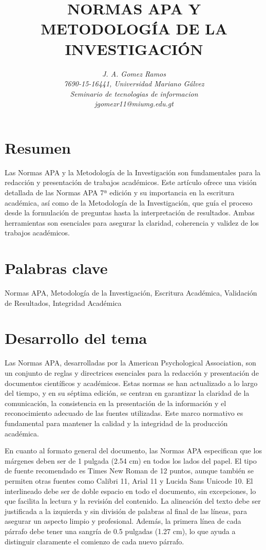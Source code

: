 \documentclass[12pt]{article}
\begin{document}
\title{\textbf{NORMAS APA Y METODOLOGÍA DE LA INVESTIGACIÓN}}
\author{\textit{J. A. Gomez Ramos}\\
\textit{7690-15-16441, Universidad Mariano Gálvez}\\
\textit{Seminario de tecnologias de informacion}\\
\textit{jgomezr11@miumg.edu.gt}}
\date{}
\maketitle

\section*{Resumen}
Las Normas APA y la Metodología de la Investigación son fundamentales para la redacción y presentación de trabajos académicos. Este artículo ofrece una visión detallada de las Normas APA 7ª edición y su importancia en la escritura académica, así como de la Metodología de la Investigación, que guía el proceso desde la formulación de preguntas hasta la interpretación de resultados. Ambas herramientas son esenciales para asegurar la claridad, coherencia y validez de los trabajos académicos.

\section*{Palabras clave}
Normas APA, Metodología de la Investigación, Escritura Académica, Validación de Resultados, Integridad Académica

\section*{Desarrollo del tema}

Las Normas APA, desarrolladas por la American Psychological Association, son un conjunto de reglas y directrices esenciales para la redacción y presentación de documentos científicos y académicos. Estas normas se han actualizado a lo largo del tiempo, y en su séptima edición, se centran en garantizar la claridad de la comunicación, la consistencia en la presentación de la información y el reconocimiento adecuado de las fuentes utilizadas. Este marco normativo es fundamental para mantener la calidad y la integridad de la producción académica.

En cuanto al formato general del documento, las Normas APA especifican que los márgenes deben ser de 1 pulgada (2.54 cm) en todos los lados del papel. El tipo de fuente recomendado es Times New Roman de 12 puntos, aunque también se permiten otras fuentes como Calibri 11, Arial 11 y Lucida Sans Unicode 10. El interlineado debe ser de doble espacio en todo el documento, sin excepciones, lo que facilita la lectura y la revisión del contenido. La alineación del texto debe ser justificada a la izquierda y sin división de palabras al final de las líneas, para asegurar un aspecto limpio y profesional. Además, la primera línea de cada párrafo debe tener una sangría de 0.5 pulgadas (1.27 cm), lo que ayuda a distinguir claramente el comienzo de cada nuevo párrafo.
\end{document}
